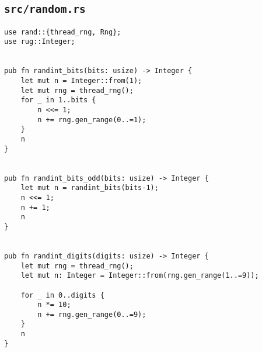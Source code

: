 \subsection{\texttt{src/random.rs}}
\begin{verbatim}
use rand::{thread_rng, Rng};
use rug::Integer;


pub fn randint_bits(bits: usize) -> Integer {
    let mut n = Integer::from(1);
    let mut rng = thread_rng();
    for _ in 1..bits {
        n <<= 1;
        n += rng.gen_range(0..=1);
    }
    n
}


pub fn randint_bits_odd(bits: usize) -> Integer {
    let mut n = randint_bits(bits-1);
    n <<= 1;
    n += 1;
    n
}


pub fn randint_digits(digits: usize) -> Integer {
    let mut rng = thread_rng();
    let mut n: Integer = Integer::from(rng.gen_range(1..=9));

    for _ in 0..digits {
        n *= 10;
        n += rng.gen_range(0..=9);
    }
    n
}
\end{verbatim}


